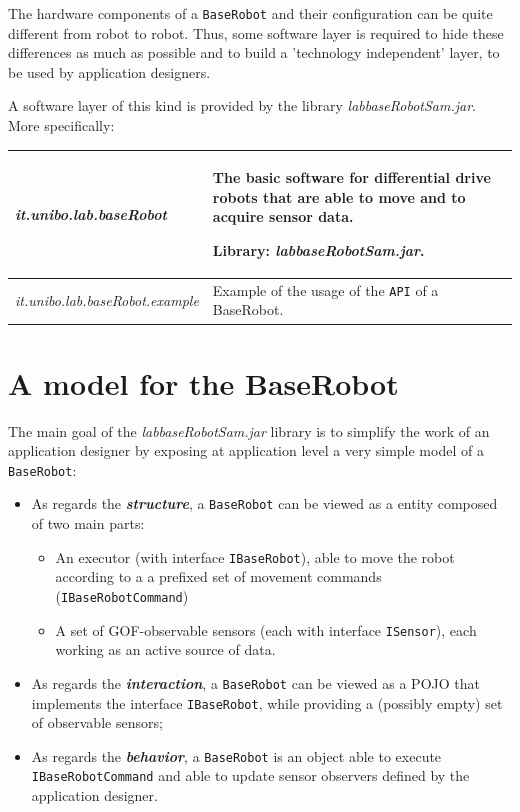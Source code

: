 The hardware components of a \texttt{BaseRobot} and their configuration can be quite different from robot to robot. Thus, some software layer is required to hide these differences as much as possible and to build a 'technology independent' layer, to be used by application designers.

A software layer of this kind is provided by the library \textit{labbaseRobotSam.jar}. More specifically:  


\medskip 
\noindent 
\begin{tabular}{|p{}|p{}|}
\hline 
\textit{it.unibo.lab.baseRobot } 
&The basic software for differential drive robots that are able to move and to acquire sensor data. 

\medskip 
Library: \textit{labbaseRobotSam.jar}. 
\\ 
\hline 
\textit{it.unibo.lab.baseRobot.example} 
&Example of the usage of the \texttt{API} of a BaseRobot.
\\ 
\hline 
\end{tabular} 


\section{A model for the BaseRobot}

The main goal of the \textit{labbaseRobotSam.jar} library is to simplify the work of an application designer by exposing at application level a very simple model of a \texttt{BaseRobot}:

\begin{itemize}
\item As regards the \textbf{\textit{structure}}, a \texttt{BaseRobot} can be viewed as a entity composed of two main parts:
\begin{itemize}
\item An executor (with interface \texttt{IBaseRobot}), able to move the robot according to a  a prefixed set of movement commands (\texttt{IBaseRobotCommand}) 
\item A set of GOF-observable sensors (each with interface \texttt{ISensor}), each working as an active source of data.
\end{itemize}
\item As regards the \textbf{\textit{interaction}}, a \texttt{BaseRobot} can be viewed as a POJO that implements the interface \texttt{IBaseRobot}, while providing a (possibly empty) set of observable sensors;
\item  As regards the \textbf{\textit{behavior}}, a \texttt{BaseRobot} is an object able to execute \texttt{IBaseRobotCommand} and able to update sensor observers defined by the application designer.
\end{itemize}


